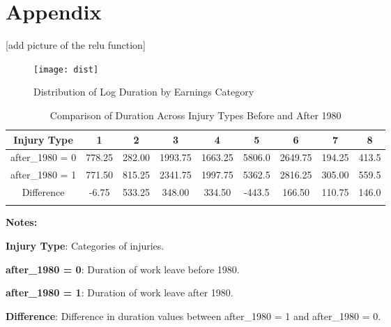 \section*{Appendix}

[add picture of the relu function]



\begin{figure}[h]
\centering
\caption{Distribution of Log Duration by Earnings Category}
\texttt{[image: dist]}
\label{fig:log_duration_distribution}
\end{figure}




\begin{table}[ht]
\centering
\caption{Comparison of Duration Across Injury Types Before and After 1980}
\begin{threeparttable}
\begin{tabular}{ccccccccc}
Injury Type & \textbf{1} & \textbf{2} & \textbf{3} & \textbf{4} & \textbf{5} & \textbf{6} & \textbf{7} & \textbf{8} \\
\hline
\hline
\addlinespace
after\_1980 = 0 & 778.25 & 282.00 & 1993.75 & 1663.25 & 5806.0 & 2649.75 & 194.25 & 413.5 \\
after\_1980 = 1 & 771.50 & 815.25 & 2341.75 & 1997.75 & 5362.5 & 2816.25 & 305.00 & 559.5 \\
Difference & -6.75 & 533.25 & 348.00 & 334.50 & -443.5 & 166.50 & 110.75 & 146.0 \\ \addlinespace
\end{tabular}
\label{tab:duration_comparison}
\begin{tablenotes}
\small
\item \textbf{Notes:}
\item \textbf{Injury Type}: Categories of injuries.
\item \textbf{after\_1980 = 0}: Duration of work leave before 1980.
\item \textbf{after\_1980 = 1}: Duration of work leave  after 1980.
\item \textbf{Difference}: Difference in duration values between after\_1980 = 1 and after\_1980 = 0.
\end{tablenotes}
\end{threeparttable}
\end{table}


